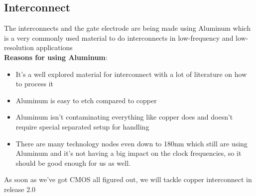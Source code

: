 \subsection{Interconnect}
The interconnects and the gate electrode are being made using Aluminum which is a very commonly used material to do interconnects in low-frequency and low-resolution applications \\

\textbf{Reasons for using Aluminum}:\begin{itemize}
\item It's a well explored material for interconnect with a lot of literature on how to process it
\item Aluminum is easy to etch compared to copper
\item Aluminum isn't contaminating everything like copper does and doesn't require special separated setup for handling
\item There are many technology nodes even down to 180nm which still are using Aluminum and it's not having a big impact on the clock frequencies, so it should be good enough for us as well.
\end{itemize}

\begin{mdframed}[linewidth=2pt,linecolor=green]
As soon as we've got CMOS all figured out, we will tackle copper interconnect in release 2.0
\end{mdframed}

